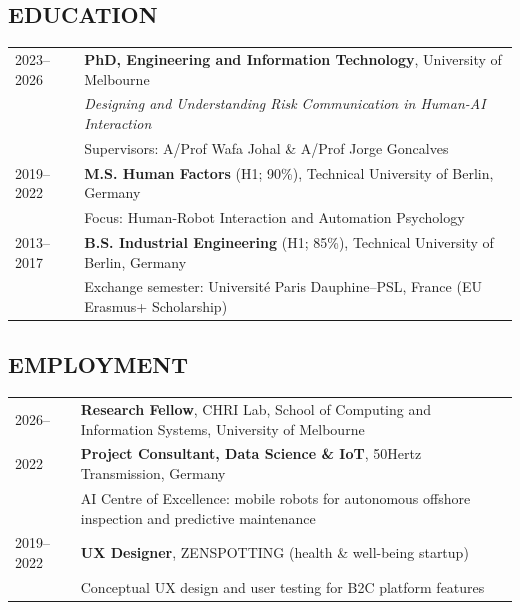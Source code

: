 \documentclass[a4paper, 11pt]{article}
\begin{document}
{\small

\subsection{EDUCATION}
\vspace{2pt}

\noindent
\begin{tabularx}{\textwidth}{@{}lX@{}}
2023--2026 & \textbf{PhD, Engineering and Information Technology}, University of Melbourne \\
           & \textit{Designing and Understanding Risk Communication in Human-AI Interaction} \\
           & Supervisors: A/Prof Wafa Johal \& A/Prof Jorge Goncalves \\[3pt]
2019--2022 & \textbf{M.S. Human Factors} (H1; 90\%), Technical University of Berlin, Germany \\
           & Focus: Human-Robot Interaction and Automation Psychology \\[3pt]
2013--2017 & \textbf{B.S. Industrial Engineering} (H1; 85\%), Technical University of Berlin, Germany \\
           & Exchange semester: Université Paris Dauphine--PSL, France (EU Erasmus+ Scholarship) \\
\end{tabularx}

\smallskip

\subsection{EMPLOYMENT}
\vspace{2pt}

\noindent
\begin{tabularx}{\textwidth}{@{}lX@{}}
2026--     & \textbf{Research Fellow}, CHRI Lab, School of Computing and Information Systems, University of Melbourne \\[2pt]
2022       & \textbf{Project Consultant, Data Science \& IoT}, 50Hertz Transmission, Germany \\
           & AI Centre of Excellence: mobile robots for autonomous offshore inspection and predictive maintenance \\[2pt]
2019--2022 & \textbf{UX Designer}, ZENSPOTTING (health \& well-being startup) \\
           & Conceptual UX design and user testing for B2C platform features \\
\end{tabularx}

}
\end{document}
